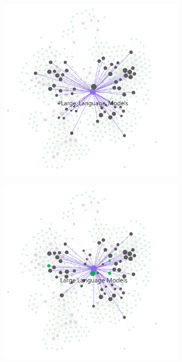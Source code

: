 \begin{figure}[h!]
    \centering
    \begin{subfigure}[b]{0.48\textwidth}
        \centering
        \includegraphics[width=\textwidth]{figures/LLM_tag_graph.png}
        \label{fig:llm_tag}
    \end{subfigure}
    \hfill
    \begin{subfigure}[b]{0.48\textwidth}
        \centering
        \includegraphics[width=\textwidth]{figures/LLM_note_graph.png}

\end{subfigure}
\end{figure}
